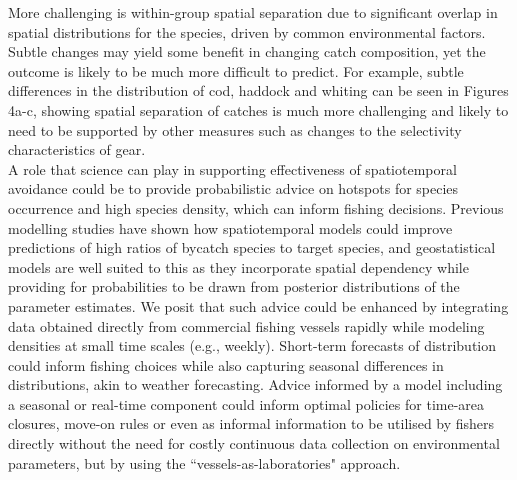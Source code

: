 \documentclass[fleqn,10pt]{wlscirep}
\begin{document}
\begin{linenumbers}
More challenging is within-group spatial separation due to significant overlap
in spatial distributions for the species, driven by common environmental
factors. Subtle changes may yield some benefit in changing catch composition,
yet the outcome is likely to be much more difficult to predict. For example,
subtle differences in the distribution of cod, haddock and whiting can be seen
in Figures 4a-c, showing spatial separation of catches is much more challenging
and likely to need to be supported by other measures such as changes to the
selectivity characteristics of gear\cite{Santos2016}. \\

A role that science can play in supporting effectiveness of spatiotemporal
avoidance could be to provide probabilistic advice on hotspots for species
occurrence and high species density, which can inform fishing decisions.
Previous modelling studies have shown how spatiotemporal models could improve
predictions of high ratios of bycatch species to target species\cite{Ward2015,
	Cosandey-Godin2015, Breivik2016}, and geostatistical models are well
suited to this as they incorporate spatial dependency while providing for
probabilities to be drawn from posterior distributions of the parameter
estimates. We posit that such advice  could be enhanced by integrating data obtained directly from
commercial fishing vessels rapidly while modeling densities at small time
scales (e.g., weekly).  Short-term forecasts of distribution could inform
fishing choices while also capturing seasonal differences in distributions,
akin to weather forecasting.  Advice informed by a model including a seasonal
or real-time component could inform optimal policies for time-area closures,
move-on rules or even as informal information to be utilised by fishers
directly without the need for costly continuous data collection on
environmental parameters, but by using the ``vessels-as-laboratories"
approach.\\


\end{linenumbers}
\end{document}
